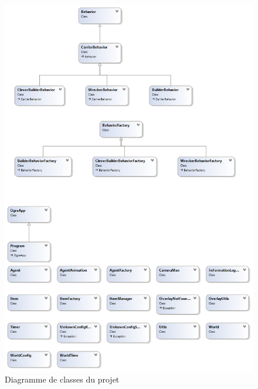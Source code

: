 \begin{figure}
    \center \includegraphics[width=15cm]{resources/ClassDiagram.png}
    \caption{Diagramme de classes du projet}
\end{figure}
